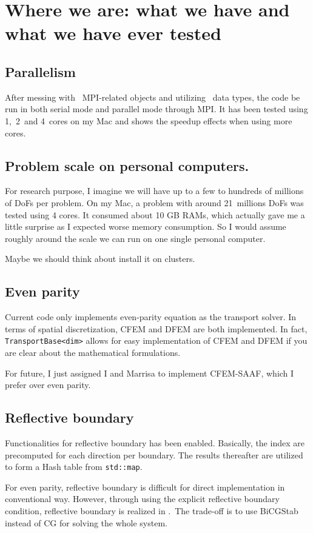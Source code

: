 \documentclass[letterpaper,11pt]{texMemo}
\begin{document}
\section{Where we are: what we have and what we have ever tested}
{
	\subsection{Parallelism}
	{
		After messing with \dealii\ MPI-related objects and utilizing \petsc\ data types, the code be run in both serial mode and parallel mode through MPI. It has been tested using 1,\ 2\ and 4\ cores on my Mac and shows the speedup effects when using more cores.
	}
	
	\subsection{Problem scale on personal computers.}
	{
		For research purpose, I imagine we will have up to a few to hundreds of millions of DoFs per problem. On my Mac, a problem with around 21\ millions DoFs was tested using 4 cores. It consumed about 10 GB RAMs, which actually gave me a little surprise as I expected worse memory consumption. So I would assume roughly around the scale we can run on one single personal computer.
		
		Maybe we should think about install it on clusters.
	}
	
	\subsection{Even parity}
	{
		Current code only implements even-parity equation as the transport solver. In terms of spatial discretization, CFEM and DFEM are both implemented. In fact, {\tt TransportBase<dim>} allows for easy implementation of CFEM and DFEM if you are clear about the mathematical formulations.
		
		For future, I just assigned I and Marrisa to implement CFEM-SAAF, which I prefer over even parity.
	}
	\subsection{Reflective boundary}
	{
		Functionalities for reflective boundary has been enabled. Basically, the index are precomputed for each direction per boundary. The results thereafter are utilized to form a Hash table from {\tt std::map}.
		
		For even parity, reflective boundary is difficult for direct implementation in conventional way. However, through using the explicit reflective boundary condition, reflective boundary is realized in \xtrans.\ The trade-off is to use BiCGStab instead of CG for solving the whole system.
	}
}
\end{document}
